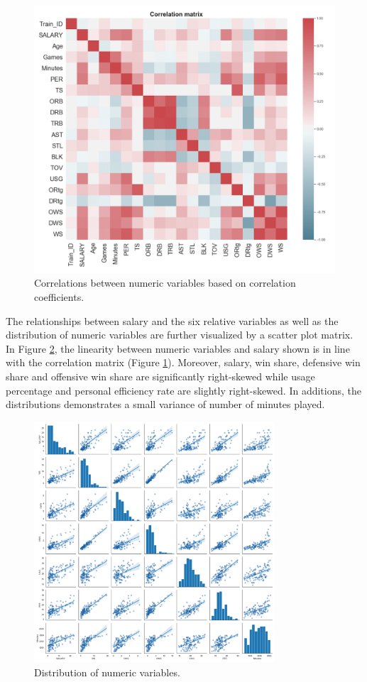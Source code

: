 \documentclass[letterpaper,12pt,twoside,]{pinp}
\begin{document}
\begin{figure}
\includegraphics[width=0.8\linewidth]{correlation.png}
\centering
\caption{Correlations between numeric variables based on correlation coefficients.}
\label{fig:correlation}
\end{figure}

The relationships between salary and the six relative variables as well
as the distribution of numeric variables are further visualized by a
scatter plot matrix. In Figure \ref{fig:scatter}, the linearity between
numeric variables and salary shown is in line with the correlation
matrix (Figure \ref{fig:correlation}). Moreover, salary, win share,
defensive win share and offensive win share are significantly
right-skewed while usage percentage and personal efficiency rate are
slightly right-skewed. In additions, the distributions demonstrates a
small variance of number of minutes played.

\begin{figure}
\includegraphics[width=0.8\textwidth]{scatter.png}
\centering
\caption{Distribution of numeric variables.}
\label{fig:scatter}
\end{figure}
\end{document}
